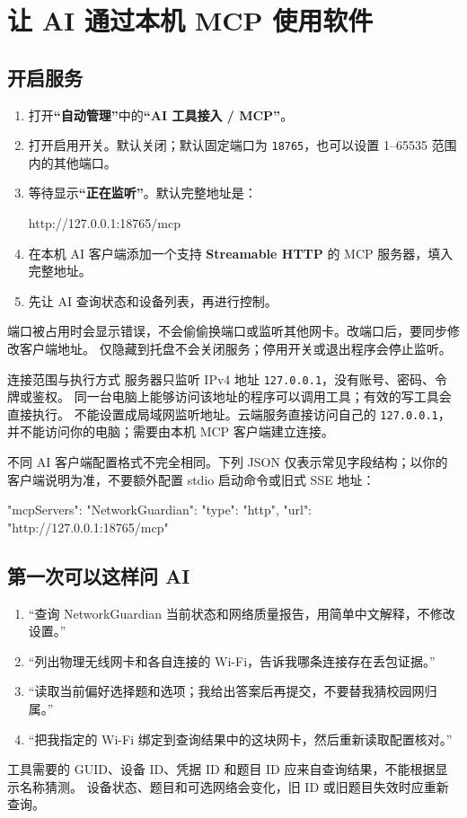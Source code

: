 \documentclass[UTF8,fontset=fandol,11pt,a4paper]{ctexart}
\newcommand{\ui}[1]{\textbf{“#1”}}
\newcommand{\tool}[1]{\nolinkurl{#1}}
\begin{document}
\section{让 AI 通过本机 MCP 使用软件}
\subsection{开启服务}
\begin{enumerate}
\item 打开\ui{自动管理}中的\ui{AI 工具接入 / MCP}。
\item 打开启用开关。默认关闭；默认固定端口为 \tool{18765}，也可以设置 1--65535 范围内的其他端口。
\item 等待显示\ui{正在监听}。默认完整地址是：
\begin{Code}
http://127.0.0.1:18765/mcp
\end{Code}
\item 在本机 AI 客户端添加一个支持 \textbf{Streamable HTTP} 的 MCP 服务器，填入完整地址。
\item 先让 AI 查询状态和设备列表，再进行控制。
\end{enumerate}
端口被占用时会显示错误，不会偷偷换端口或监听其他网卡。改端口后，要同步修改客户端地址。
仅隐藏到托盘不会关闭服务；停用开关或退出程序会停止监听。

\begin{guidebox}{连接范围与执行方式}
服务器只监听 IPv4 地址 \tool{127.0.0.1}，没有账号、密码、令牌或鉴权。
同一台电脑上能够访问该地址的程序可以调用工具；有效的写工具会直接执行。
不能设置成局域网监听地址。云端服务直接访问自己的 \tool{127.0.0.1}，并不能访问你的电脑；需要由本机 MCP 客户端建立连接。
\end{guidebox}

不同 AI 客户端配置格式不完全相同。下列 JSON 仅表示常见字段结构；以你的客户端说明为准，不要额外配置 stdio 启动命令或旧式 SSE 地址：
\par\noindent\begin{minipage}{\linewidth}
\begin{Code}
{
  "mcpServers": {
    "NetworkGuardian": {
      "type": "http",
      "url": "http://127.0.0.1:18765/mcp"
    }
  }
}
\end{Code}
\end{minipage}

\subsection{第一次可以这样问 AI}
\begin{enumerate}
\item “查询 NetworkGuardian 当前状态和网络质量报告，用简单中文解释，不修改设置。”
\item “列出物理无线网卡和各自连接的 Wi-Fi，告诉我哪条连接存在丢包证据。”
\item “读取当前偏好选择题和选项；我给出答案后再提交，不要替我猜校园网归属。”
\item “把我指定的 Wi-Fi 绑定到查询结果中的这块网卡，然后重新读取配置核对。”
\end{enumerate}
工具需要的 GUID、设备 ID、凭据 ID 和题目 ID 应来自查询结果，不能根据显示名称猜测。
设备状态、题目和可选网络会变化，旧 ID 或旧题目失效时应重新查询。
\end{document}
